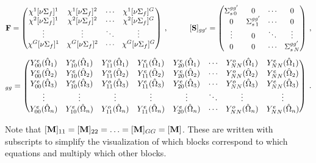  \begin{alignat}{2}
      \mathbf{F}  &=     \begin{pmatrix}
     \chi^{1}[\nu\Sigma_{f}]^{1} &\chi^{1}[\nu\Sigma_{f}]^{2} & \cdots &
      \chi^{1}[\nu\Sigma_{f}]^{G} \\
      \chi^{2}[\nu\Sigma_{f}]^{1} &\chi^{2}[\nu\Sigma_{f}]^{2} & \cdots &
      \chi^{2}[\nu\Sigma_{f}]^{G}\\
      \vdots & \vdots & \ddots & \vdots \\
      \chi^{G}[\nu\Sigma_{f}]^{1} &\chi^{G}[\nu\Sigma_{f}]^{2} & \cdots &
      \chi^{G}[\nu\Sigma_{f}]^{G}\\
    \end{pmatrix} \:, \nonumber & \qquad
  [\mathbf{S}]_{gg'} = \begin{pmatrix}
    \Sigma^{gg'}_{s\,0} & 0 & \cdots & 0  \\
    0 & \Sigma^{gg'}_{s\,1} & \cdots & 0 \\
    \vdots & 0 & \ddots  & \vdots \\
     0 & 0 & \cdots & \Sigma^{gg'}_{s\,N}
  \end{pmatrix}\:, \nonumber
 \end{alignat}
\begin{equation}    
   [\ve{M}]_{gg} = \begin{pmatrix}
    \Ye{00}{1} & \Ye{10}{1} & \Yo{11}{1} & \Ye{11}{1} & 
    \Ye{20}{1} & \cdots & \Yo{NN}{1} & \Ye{NN}{1} \\
    \Ye{00}{2} & \Ye{10}{2} & \Yo{11}{2} & \Ye{11}{2} & 
    \Ye{20}{2} & \cdots & \Yo{NN}{2} & \Ye{NN}{2} \\
    \Ye{00}{3} & \Ye{10}{3} & \Yo{11}{3} & \Ye{11}{3} & 
    \Ye{20}{3} & \cdots & \Yo{NN}{3} & \Ye{NN}{3} \\
    \vdots     & \vdots     & \vdots     & \vdots     & 
    \vdots     &  \ddots    & \vdots     & \vdots     \\
    \Ye{00}{n} & \Ye{10}{n} & \Yo{11}{n} & \Ye{11}{n} & 
    \Ye{20}{n} & \cdots & \Yo{NN}{n} & \Ye{NN}{n}
  \end{pmatrix}\:. \nonumber \\
\end{equation}

\noindent Note that $[\mathbf{M}]_{11} = [\mathbf{M}]_{22} =  \hdots = [\mathbf{M}]_{GG} = [\mathbf{M}]$. These are written with subscripts to simplify the visualization of which blocks correspond to which equations and multiply which other blocks. 

